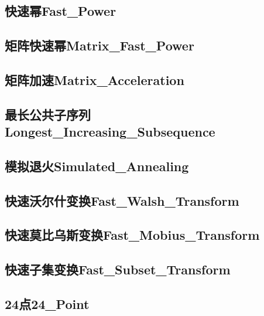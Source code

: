 \documentclass[10pt,a4paper]{article}
\begin{document}
\subsection{快速幂Fast\_Power}

\subsection{矩阵快速幂Matrix\_Fast\_Power}

\subsection{矩阵加速Matrix\_Acceleration}

\subsection{最长公共子序列Longest\_Increasing\_Subsequence}

\subsection{模拟退火Simulated\_Annealing}

\subsection{快速沃尔什变换Fast\_Walsh\_Transform}

\subsection{快速莫比乌斯变换Fast\_Mobius\_Transform}

\subsection{快速子集变换Fast\_Subset\_Transform}

\subsection{24点24\_Point}

\end{document}
